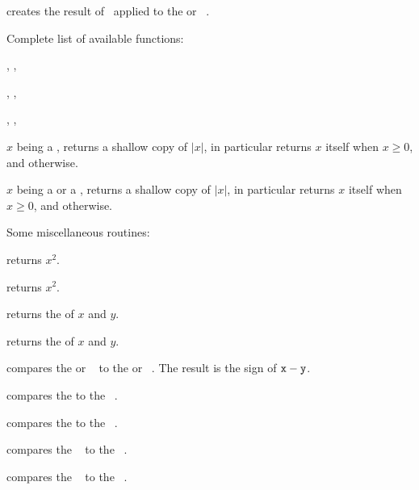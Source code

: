  creates the result of \op\ applied to the
 or ~.

\noindent Complete list of available functions:

, , 

, , 

, , 

 $x$ being a , returns a shallow copy of
$|x|$, in particular returns $x$ itself when $x \geq 0$, and 
otherwise.

 $x$ being a  or a , returns
a shallow copy of $|x|$, in particular returns $x$ itself when $x \geq 0$, and
 otherwise.


\noindent Some miscellaneous routines:

 returns $x^2$.

 returns $x^2$.




 returns the  of $x$ and $y$.




 returns the  of $x$ and $y$.

\smallskip

 compares the  or ~
to the  or ~. The result is the sign of
${\tt x}-{\tt y}$.

 compares the   to the
~.

 compares the   to the
~.

 compares the ~ to the
~.

 compares the ~ to the
~.

